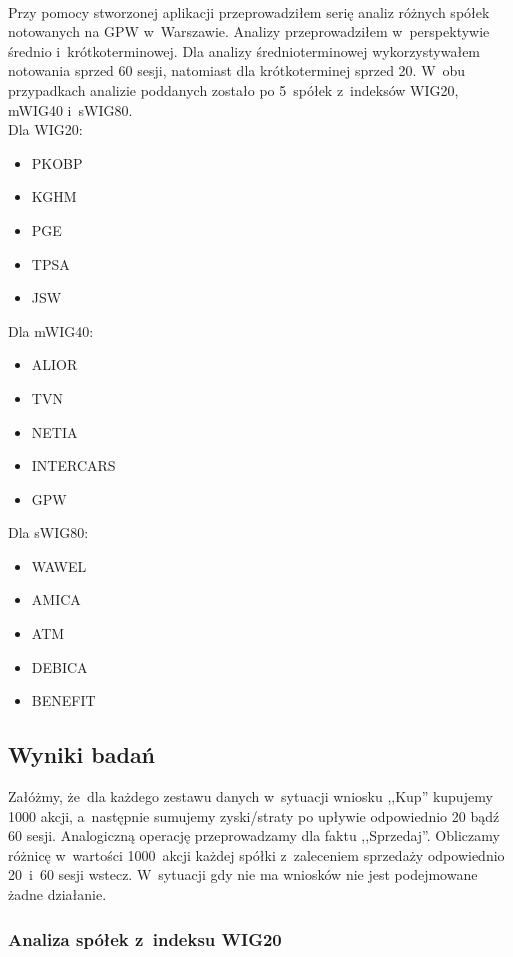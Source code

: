 \paragraph{}
Przy pomocy stworzonej aplikacji przeprowadziłem serię analiz różnych spółek notowanych na GPW w~Warszawie. Analizy przeprowadziłem w~perspektywie średnio i~krótkoterminowej. Dla analizy średnioterminowej wykorzystywałem notowania sprzed 60 sesji, natomiast dla krótkoterminej sprzed 20. W~obu przypadkach analizie poddanych zostało po 5~spółek z~indeksów WIG20, mWIG40 i~sWIG80.\\
Dla WIG20:
\begin{itemize}
	\item PKOBP
	\item KGHM
	\item PGE
	\item TPSA
	\item JSW
\end{itemize}

Dla mWIG40:
\begin{itemize}
	\item ALIOR
	\item TVN
	\item NETIA
	\item INTERCARS
	\item GPW
\end{itemize}

Dla sWIG80:
\begin{itemize}
	\item WAWEL
	\item AMICA
	\item ATM
	\item DEBICA
	\item BENEFIT
\end{itemize}

\subsection{Wyniki badań}

Załóżmy, że~dla każdego zestawu danych w~sytuacji wniosku ,,Kup'' kupujemy 1000 akcji, a~następnie sumujemy zyski/straty po upływie odpowiednio 20 bądź 60 sesji. Analogiczną operację przeprowadzamy dla faktu ,,Sprzedaj''. Obliczamy różnicę w~wartości 1000~akcji każdej spółki z~zaleceniem sprzedaży odpowiednio 20~i~60 sesji wstecz. W~sytuacji gdy nie ma wniosków nie jest podejmowane żadne działanie.

\subsubsection{Analiza spółek z~indeksu WIG20}


